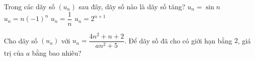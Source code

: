\begin{ex}%
	Trong các dãy số $\left(u_n\right)$ sau đây, dãy số  nào là dãy số tăng?
	 \choice
		{$u_n=\sin  n$}
		{$u_n=n(-1)^n$} 
		 {$u_n=\dfrac{1}{n}$}
		{\True $u_n=2^{n+1}$} 
\end{ex}

\begin{ex}%
	 Cho dãy số $(u_n)$ với $u_n=\dfrac{4n^2+n+2}{a n^2+5}$. Để dãy số đã cho có giới hạn bằng $2$, giá trị của $a$ bằng bao nhiêu?
\end{ex}
